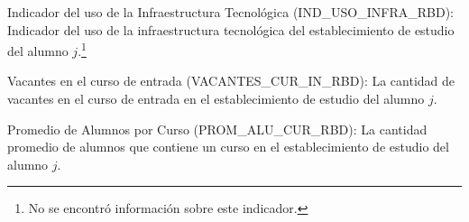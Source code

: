 \begin{longdescription}
     \item[Indicador del uso de la Infraestructura Tecnológica](IND\_USO\_INFRA\_RBD):
     Indicador del uso de la infraestructura tecnológica del establecimiento de estudio del alumno $j$.\footnote{No se encontró información sobre este indicador.}
     \item[Vacantes en el curso de entrada](VACANTES\_CUR\_IN\_RBD):
     La cantidad de vacantes en el curso de entrada en el establecimiento de estudio del alumno $j$.
     \item[Promedio de Alumnos por Curso](PROM\_ALU\_CUR\_RBD):
        La cantidad promedio de alumnos que contiene un curso en el establecimiento de estudio del alumno $j$.
\end{longdescription}